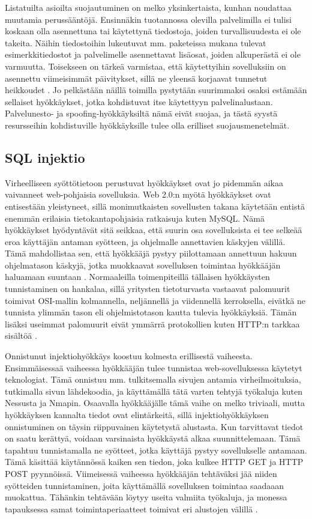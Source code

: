 Listatuilta asioilta suojautuminen on melko yksinkertaista, kunhan noudattaa muutamia perussääntöjä. Ensinnäkin tuotannossa 
olevilla palvelimilla ei tulisi koskaan olla asennettuna tai käytettynä tiedostoja, joiden turvallisuudesta ei ole
takeita. Näihin tiedostoihin lukeutuvat mm. paketeissa mukana tulevat esimerkkitiedostot ja palvelimelle asennettavat 
lisäosat, joiden alkuperästä ei ole varmuutta. Toisekseen on tärkeä varmistaa, että käytettyihin sovelluksiin
on asennettu viimeisimmät päivitykset, sillä ne yleensä korjaavat tunnetut heikkoudet \cite{Hacking}. Jo pelkästään näillä 
toimilla pystytään suurimmaksi osaksi estämään sellaiset hyökkäykset, jotka kohdistuvat itse käytettyyn palvelinalustaan.
Palvelunesto- ja spoofing-hyökkäyksiltä nämä eivät suojaa, ja tästä syystä resursseihin kohdistuville hyökkäyksille
tulee olla erilliset suojausmenetelmät.
\newpage

\subsection{SQL injektio}

Virheelliseen syöttötietoon perustuvat hyökkäykset ovat jo pidemmän aikaa vaivanneet web-pohjaisia sovelluksia.
Web 2.0:n myötä hyökkäykset ovat entisestään yleistyneet, sillä monimutkaisten sovellusten takana käytetään entistä
enemmän erilaisia tietokantapohjaisia ratkaisuja kuten MySQL. Nämä hyökkäykset hyödyntävät sitä seikkaa, että suurin osa
sovelluksista ei tee selkeää eroa käyttäjän antaman syötteen, ja ohjelmalle annettavien käskyjen välillä. Tämä mahdollistaa
sen, että hyökkääjä pystyy piilottamaan annettuun hakuun ohjelmatason käskyjä, jotka muokkaavat sovelluksen toimintaa
hyökkääjän haluamaan suuntaan \cite{WEB2}. Normaaleilla toimenpiteillä tällaisen hyökkäysten tunnistaminen on hankalaa, sillä
yritysten tietoturvasta vastaavat palomuurit toimivat OSI-mallin kolmannella, neljännellä ja viidennellä kerroksella, eivätkä ne tunnista
ylimmän tason eli ohjelmistotason kautta tulevia hyökkäyksiä. Tämän lisäksi useimmat palomuurit eivät ymmärrä protokollien
kuten HTTP:n tarkkaa sisältöä \cite{SQLSS}.    

Onnistunut injektiohyökkäys koostuu kolmesta erillisestä vaiheesta. Ensimmäisessaä vaiheessa hyökkääjän tulee tunnistaa 
web-sovelluksessa käytetyt teknologiat. Tämä onnistuu mm. tulkitsemalla sivujen antamia virheilmoituksia, tutkimalla 
sivun lähdekoodia, ja käyttämällä tätä varten tehtyjä työkaluja kuten Nessusta ja Nmapin. Osaavalla hyökkääjälle tämä vaihe on melko triviaali, 
mutta hyökkäyksen kannalta tiedot ovat elintärkeitä, sillä injektiohyökkäyksen onnistuminen on täysin riippuvainen 
käytetystä alustasta. Kun tarvittavat tiedot on saatu kerättyä, voidaan varsinaista hyökkäystä alkaa suunnittelemaan.
Tämä tapahtuu tunnistamalla ne syötteet, jotka käyttäjä pystyy sovellukselle antamaan. Tämä käsittää käytännössä kaiken sen 
tiedon, joka kulkee HTTP GET ja HTTP POST pyynnöissä. Viimeisessä vaiheessa hyökkääjän tehtäväksi jää niiden syötteiden 
tunnistaminen, joita käyttämällä sovelluksen toimintaa saadaaan muokattua. Tähänkin tehtävään löytyy useita valmiita työkaluja, ja
monessa tapauksessa samat toimintaperiaatteet toimivat eri alustojen välillä \cite{WEB2}.

